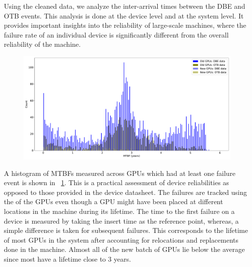 Using the cleaned data, we analyze the inter-arrival times between the DBE and OTB events. 
This analysis is done at the device level and at the system level. 
It provides important insights into the reliability of large-scale machines, where the 
failure rate of an individual device is significantly different from the overall reliability
of the machine.  

\begin{figure}[bt]
  \begin{center}
    \includegraphics[trim={0 1em 0 1em},clip,width=\columnwidth]{figs/MTBF_GPUwise_yrs_OldNew.pdf}
  \end{center}
  \caption{}
  \label{fig:Device_MTBFs}
\end{figure}
A histogram of MTBFs measured across GPUs which had at least one failure event is shown 
in ~\ref{fig:Device_MTBFs}. This is a practical assessment of device reliabilities 
as opposed to those provided in the device datasheet. The failures are tracked using the
 of the GPUs even though a GPU might have been placed at different locations in the 
machine during its lifetime. The time to the first failure on a device is measured by taking
the insert time as the reference point, whereas, a simple difference is taken for subsequent
failures.  This corresponds to the lifetime of most GPUs in the system after accounting 
for relocations and replacements done in the machine. Almost all of the new batch of GPUs lie below 
the average since most have a lifetime close to 3 years. 

